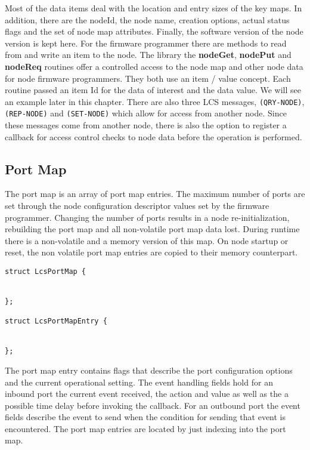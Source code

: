 Most of the data items deal with the location and entry sizes of the key maps. In addition, there are the nodeId, the node name, creation options, actual status flags and the set of node map attributes. Finally, the software version of the node version is kept here. For the firmware programmer there are methods to read from and write an item to the node. The library the \textbf{nodeGet}, \textbf{nodePut} and \textbf{nodeReq} routines offer a controlled access to the node map and other node data for node firmware programmers. They both use an item / value concept. Each routine passed an item Id for the data of interest and the data value. We will see an example later in this chapter. There are also three LCS messages, \texttt{(QRY-NODE)}, \texttt{(REP-NODE)} and \texttt{(SET-NODE)} which allow for access from another node. Since these messages come from another node, there is also the option to register a callback for access control checks to node data before the operation is performed.

\subsection{Port Map}

The port map is an array of port map entries. The maximum number of ports are set through the node configuration descriptor values set by the firmware programmer. Changing the number of ports results in a node re-initialization, rebuilding the port map and all non-volatile port map data lost. During runtime there is a non-volatile and a memory version of this map. On node startup or reset, the non volatile port map entries are copied to their memory counterpart.

\lstset{language=c++, style=codesnippetstyle}

\begin{lstlisting}
struct LcsPortMap {

  
};

struct LcsPortMapEntry {


};
\end{lstlisting}
\FloatBarrier

The port map entry contains flags that describe the port configuration options and the current operational setting. The event handling fields hold for an inbound port the current event received, the action and value as well as the a possible time delay before invoking the callback. For an outbound port the event fields describe the event to send when the condition for sending that event is encountered. The port map entries are located by just indexing into the port map.

